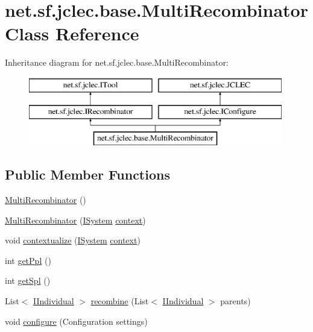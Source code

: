 \hypertarget{classnet_1_1sf_1_1jclec_1_1base_1_1_multi_recombinator}{\section{net.\-sf.\-jclec.\-base.\-Multi\-Recombinator Class Reference}
\label{classnet_1_1sf_1_1jclec_1_1base_1_1_multi_recombinator}
}
Inheritance diagram for net.\-sf.\-jclec.\-base.\-Multi\-Recombinator\-:\begin{figure}[H]
\begin{center}
\leavevmode
\includegraphics[height=3.000000cm]{classnet_1_1sf_1_1jclec_1_1base_1_1_multi_recombinator}
\end{center}
\end{figure}
\subsection*{Public Member Functions}
\begin{DoxyCompactItemize}
\item 
\hyperlink{classnet_1_1sf_1_1jclec_1_1base_1_1_multi_recombinator_ab9ac47f54a5a218b6c6df04f1ae0fde6}{Multi\-Recombinator} ()
\item 
\hyperlink{classnet_1_1sf_1_1jclec_1_1base_1_1_multi_recombinator_a028b5293d2d5a2e4b5ff2517cfb6c056}{Multi\-Recombinator} (\hyperlink{interfacenet_1_1sf_1_1jclec_1_1_i_system}{I\-System} \hyperlink{classnet_1_1sf_1_1jclec_1_1base_1_1_multi_recombinator_ab501674a548d5e3da0f711a99188eeb2}{context})
\item 
void \hyperlink{classnet_1_1sf_1_1jclec_1_1base_1_1_multi_recombinator_a3919dc3aeb37b38753c029c22f27a307}{contextualize} (\hyperlink{interfacenet_1_1sf_1_1jclec_1_1_i_system}{I\-System} \hyperlink{classnet_1_1sf_1_1jclec_1_1base_1_1_multi_recombinator_ab501674a548d5e3da0f711a99188eeb2}{context})
\item 
int \hyperlink{classnet_1_1sf_1_1jclec_1_1base_1_1_multi_recombinator_a824b6e909c4705c430552a4e08ab3874}{get\-Ppl} ()
\item 
int \hyperlink{classnet_1_1sf_1_1jclec_1_1base_1_1_multi_recombinator_ae99c3900dd57bd31b3ad1e137806cd6e}{get\-Spl} ()
\item 
List$<$ \hyperlink{interfacenet_1_1sf_1_1jclec_1_1_i_individual}{I\-Individual} $>$ \hyperlink{classnet_1_1sf_1_1jclec_1_1base_1_1_multi_recombinator_a4653c318bd06209743141b6da195133e}{recombine} (List$<$ \hyperlink{interfacenet_1_1sf_1_1jclec_1_1_i_individual}{I\-Individual} $>$ parents)
\item 
void \hyperlink{classnet_1_1sf_1_1jclec_1_1base_1_1_multi_recombinator_ac96840f8aaf035ec6f22c79f5958f459}{configure} (Configuration settings)
\end{DoxyCompactItemize}

